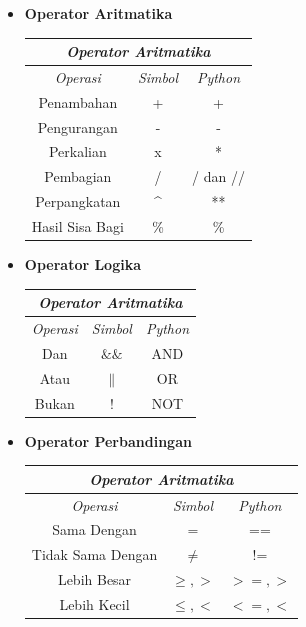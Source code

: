 \begin{itemize}

	\item \textbf{Operator Aritmatika}
			\large
			\begin{center}
				\begin{tabular}[h!]{| c | c | c |}
				\hline
				\multicolumn{3}{|c|}{\textit{Operator Aritmatika}} \\
				\hline	
				\textit{Operasi} & \textit{Simbol} & \textit{Python} \\ \hline
				Penambahan & + & + \\ \hline
				Pengurangan & - & - \\ \hline
				Perkalian & x & * \\ \hline
				Pembagian & / & / dan // \\ \hline
				Perpangkatan & \^{}  & ** \\ \hline
				Hasil Sisa Bagi & \% & \% \\
				\hline
				\end{tabular}
		\end{center}
			

	\item \textbf{Operator Logika}
			\large
			\begin{center}
				\begin{tabular}[h!]{| c | c | c |}
				\hline
				\multicolumn{3}{|c|}{\textit{Operator Aritmatika}} \\
				\hline	
				\textit{Operasi} & \textit{Simbol} & \textit{Python} \\ \hline
				Dan & $\&\&$ & AND \\ \hline
				Atau & $\|$ & OR \\ \hline
				Bukan & $!$ & NOT \\ 
				\hline
				\end{tabular}
		\end{center}

	
	\item \textbf{Operator Perbandingan}
			\large
			\begin{center}
				\begin{tabular}[h!]{| c | c | c |}
				\hline
				\multicolumn{3}{|c|}{\textit{Operator Aritmatika}} \\
				\hline	
				\textit{Operasi} & \textit{Simbol} & \textit{Python} \\ \hline
				Sama Dengan & $=$ & == \\ \hline
				Tidak Sama Dengan & $\neq$ & != \\ \hline
				Lebih Besar & $\geq,>$ & $>=,>$ \\ \hline
				Lebih Kecil & $\leq,<$ & $<=,<$ \\
				\hline
				\end{tabular}
		\end{center}
\end{itemize}

